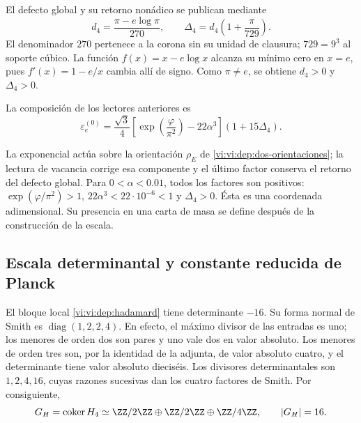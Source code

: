 El defecto global y su retorno nonádico se publican mediante
\begin{equation}
 d_4=\frac{\pi-e\log\pi}{270},\qquad
 \Delta_4=d_4\left(1+\frac{\pi}{729}\right).
 \label{vi:vi:dep:delta4}
\end{equation}
El denominador \(270\) pertenece a la corona sin su unidad de
clausura; \(729=9^3\) al soporte cúbico. La función
\(f(x)=x-e\log x\) alcanza su mínimo cero en \(x=e\), pues
\(f'(x)=1-e/x\) cambia allí de signo. Como \(\pi\ne e\),
se obtiene \(d_4>0\) y \(\Delta_4>0\).

\begin{definition}
\label{vi:vi:dep:electron-basal}
La composición de los lectores anteriores es
\begin{equation}
 \varepsilon_e^{(0)}=
 \frac{\sqrt3}{4}
 \left[\exp\left(\frac{\varphi}{\pi^2}\right)-22\alpha^3\right]
 (1+15\Delta_4).
 \label{vi:vi:dep:formula-basal}
\end{equation}
\end{definition}
La exponencial actúa sobre la orientación \(\rho_E\) de
\eqref{vi:vi:dep:dos-orientaciones}; la lectura de vacancia corrige esa
componente y el último factor conserva el retorno del defecto global.
Para \(0<\alpha<0.01\), todos los factores son positivos:
\(\exp(\varphi/\pi^2)>1\), \(22\alpha^3<22\cdot10^{-6}<1\)
y \(\Delta_4>0\). Ésta es una coordenada adimensional. Su presencia
en una carta de masa se define después de la construcción de la escala.

\subsection{Escala determinantal y constante reducida de Planck}
\label{vi:vi:dep:planck}

El bloque local \eqref{vi:vi:dep:hadamard} tiene determinante \(-16\).
Su forma normal de Smith es \(\operatorname{diag}(1,2,2,4)\).
En efecto, el máximo divisor de las entradas es uno; los menores de
orden dos son pares y uno vale dos en valor absoluto. Los menores de
orden tres son, por la identidad de la adjunta, de valor absoluto cuatro,
y el determinante tiene valor absoluto dieciséis. Los divisores
determinantales son \(1,2,4,16\), cuyas razones sucesivas dan los
cuatro factores de Smith. Por consiguiente,
\begin{equation}
 G_H=\operatorname{coker}H_4
 \simeq\ZZ/2\ZZ\oplus\ZZ/2\ZZ\oplus\ZZ/4\ZZ,
 \qquad |G_H|=16.
 \label{vi:vi:dep:conucleo}
\end{equation}

